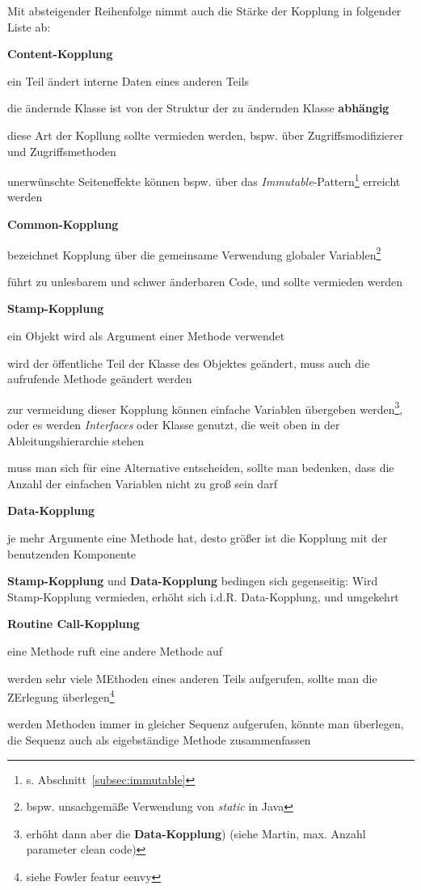 \noindent
Mit absteigender Reihenfolge nimmt auch die Stärke der Kopplung in folgender Liste ab:


\begin{itemize}
    \item \textbf{Content-Kopplung}
    \item[] ein Teil ändert interne Daten eines anderen Teils
    \item[] die ändernde Klasse ist von der Struktur der zu ändernden Klasse \textbf{abhängig}
    \item[] diese Art der Kopllung sollte vermieden werden, bspw. über Zugriffsmodifizierer und Zugriffsmethoden
    \item[] unerwünschte Seiteneffekte können bspw. über das \textit{Immutable}-Pattern\footnote{
    s. Abschnitt~\ref{subsec:immutable}
    } erreicht werden
    \item \textbf{Common-Kopplung}
    \item[] bezeichnet Kopplung über die gemeinsame Verwendung globaler Variablen\footnote{
        bspw. unsachgemäße Verwendung von \textit{static} in Java
    }
    \item[] führt zu unlesbarem und schwer änderbaren Code, und sollte vermieden werden
    \item \textbf{Stamp-Kopplung}
    \item[] ein Objekt wird als Argument einer Methode verwendet
    \item[] wird der öffentliche Teil der Klasse des Objektes geändert, muss auch die aufrufende Methode geändert werden
    \item[] zur vermeidung dieser Kopplung können einfache Variablen übergeben werden\footnote{
        erhöht dann aber die \textbf{Data-Kopplung}) (siehe Martin, max. Anzahl parameter clean code)
    \item }, oder es werden \textit{Interfaces} oder Klasse genutzt, die weit oben in der Ableitungshierarchie stehen
    \item[] muss man sich für eine Alternative entscheiden, sollte man bedenken, dass die Anzahl der einfachen Variablen nicht zu groß sein darf
    \item \textbf{Data-Kopplung}
    \item[] je mehr Argumente eine Methode hat, desto größer ist die Kopplung mit der benutzenden Komponente
    \item[] \textbf{Stamp-Kopplung} und \textbf{Data-Kopplung} bedingen sich gegenseitig: Wird Stamp-Kopplung vermieden, erhöht sich i.d.R. Data-Kopplung, und umgekehrt
    \item \textbf{Routine Call-Kopplung}
    \item[] eine Methode ruft eine andere Methode auf
    \item[] werden sehr viele MEthoden eines anderen Teils aufgerufen, sollte man die ZErlegung überlegen\footnote{
    siehe Fowler featur eenvy
    }
    \item[] werden Methoden immer in gleicher Sequenz aufgerufen, könnte man überlegen, die Sequenz auch als eigebständige Methode zusammenfassen
\end{itemize}